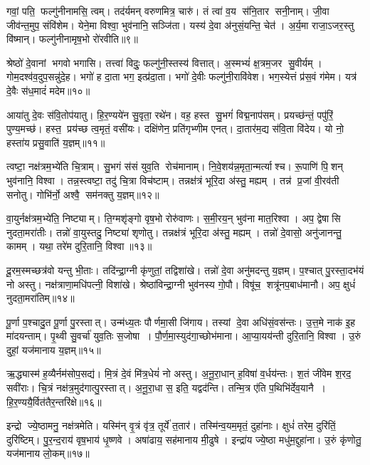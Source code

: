 गवां॒ पति॒ फल्गु॑नीनामसि॒ त्वम्। तद॑र्यमन् वरुणमित्र॒ चारु॑। तं त्वा॑ व॒य स॑नि॒तार सनी॒नाम्। जी॒वा जीव॑न्त॒मुप॒ संवि॑शेम। येने॒मा विश्वा॒ भुव॑नानि॒ सञ्जि॑ता। यस्य॑ दे॒वा अ॑नुसं॒यन्ति॒ चेत॑। अ॒र्य॒मा राजा॒ऽजर॒स्तु वि॑ष्मान्। फल्गु॑नीनामृष॒भो रो॑रवीति॥९॥ 

श्रेष्ठो॑ दे॒वानां भगवो भगासि। तत्त्वा॑ विदुः॒ फल्गु॑नी॒स्तस्य॑ वित्तात्। अ॒स्मभ्यं॑ क्ष॒त्रम॒जर सु॒वीर्यम्। गोम॒दश्व॑व॒दुप॒सन्नु॑दे॒ह। भगो॑ ह दा॒ता भग॒ इत्प्र॑दा॒ता। भगो॑ दे॒वीः फल्गु॑नी॒रावि॑वेश। भग॒स्येत्तं प्र॑स॒वं ग॑मेम। यत्र॑ दे॒वैः स॑ध॒मादं॑ मदेम॥१०॥ 

आया॑तु दे॒वः स॑वि॒तोप॑यातु। हि॒र॒ण्यये॑न सु॒वृता॒ रथे॑न। वह॒\an{} हस्त सु॒भगं॑ विद्म॒नाप॑सम्। प्रयच्छ॑न्तं॒ पपु॑रिं॒ पुण्य॒मच्छ॑। हस्त॒ प्रय॑च्छ त्व॒मृतं॒ वसी॑यः। दक्षि॑णेन॒ प्रति॑गृभ्णीम एनत्। दा॒तार॑म॒द्य स॑वि॒ता वि॑देय। यो नो॒ हस्ता॑य प्रसु॒वाति॑ य॒ज्ञम्॥११॥ 

त्वष्टा॒ नक्ष॑त्रम॒भ्ये॑ति चि॒त्राम्। सु॒भगं स॑सं युव॒ति रोच॑मानाम्। नि॒वे॒शय॑न्न॒\-मृता॒न्मर्त्याश्च। रू॒पाणि॑ पि॒शन् भुव॑नानि॒ विश्वा। तन्न॒स्त्वष्टा॒ तदु॑ चि॒त्रा विच॑ष्टाम्। तन्नक्ष॑त्रं भूरि॒दा अ॑स्तु॒ मह्यम्। तन्न॑ प्र॒जां वी॒रव॑ती सनोतु। गोभि॑र्नो॒ अश्वै॒ सम॑नक्तु य॒ज्ञम्॥१२॥ 

वा॒युर्नक्ष॑त्रम॒भ्ये॑ति॒ निष्ट्याम्। ति॒ग्मशृ॑ङ्गो वृष॒भो रोरु॑वाणः। स॒मी॒रय॒न् भुव॑ना मात॒रिश्वा। अप॒ द्वेषासि नुदता॒मरा॑तीः। तन्नो॑ वा॒युस्तदु॒ निष्ट्या॑ शृणोतु। तन्नक्ष॑त्रं भूरि॒दा अ॑स्तु॒ मह्यम्। तन्नो॑ दे॒वासो॒ अनु॑जानन्तु॒ कामम्। यथा॒ तरे॑म दुरि॒तानि॒ विश्वा॥१३॥ 

दू॒रम॒स्मच्छत्र॑वो यन्तु भी॒ताः। तदि॑न्द्रा॒ग्नी कृ॑णुतां॒ तद्विशा॑खे। तन्नो॑ दे॒वा अनु॑मदन्तु य॒ज्ञम्। प॒श्चात् पु॒रस्ता॒दभ॑यं नो अस्तु। नक्ष॑त्राणा॒मधि॑पत्नी॒ विशा॑खे। श्रेष्ठा॑विन्द्रा॒ग्नी भुव॑नस्य गो॒पौ। विषू॑च॒ शत्रू॑नप॒बाध॑मानौ। अप॒ क्षुधं॑ नुदता॒मरा॑तिम्॥१४॥ 

पू॒र्णा प॒श्चादु॒त पू॒र्णा पु॒रस्तात्। उन्म॑ध्य॒तः पौर्णमा॒सी जि॑गाय। तस्यां दे॒वा अधि॑सं॒वस॑न्तः। उ॒त्त॒मे नाक॑ इ॒ह मा॑दयन्ताम्। पृ॒थ्वी सु॒वर्चा॑ युव॒तिः स॒जोषा। पौ॒र्ण॒मा॒स्युद॑गा॒च्छोभ॑माना। आ॒प्या॒यय॑न्ती दुरि॒तानि॒ विश्वा। उ॒रुं दुहां॒ यज॑मानाय य॒ज्ञम्॥१५॥ 

ऋ॒द्ध्यास्म॑ ह॒व्यैर्नम॑सोप॒सद्य॑। मि॒त्रं दे॒वं मि॑त्र॒धेयं॑ नो अस्तु। अ॒नू॒रा॒धान् ह॒विषा॑ व॒र्धय॑न्तः। श॒तं जी॑वेम श॒रद॒ सवी॑राः। चि॒त्रं नक्ष॑त्र॒मुद॑गात्पु॒रस्तात्। अ॒नू॒रा॒धा स॒ इति॒ यद्वद॑न्ति। तन्मि॒त्र ए॑ति प॒थिभि॑र्देव॒यानै। हि॒र॒ण्ययै॒र्वित॑तै\-र॒न्तरि॑क्षे॥१६॥ 

इन्द्रो ज्ये॒ष्ठामनु॒ नक्ष॑त्रमेति। यस्मि॑न् वृ॒त्रं वृ॑त्र॒ तूर्ये॑ त॒तार॑। तस्मि॑न्व॒यम॒मृतं॒ दुहा॑नाः। क्षुधं॑ तरेम॒ दुरि॑तिं॒ दुरि॑ष्टिम्। पु॒र॒न्द॒राय॑ वृष॒भाय॑ धृ॒ष्णवे। अषा॑ढाय॒ सह॑मानाय मी॒ढुषे। इन्द्रा॑य ज्ये॒ष्ठा मधु॑म॒द्दुहा॑ना। उ॒रुं कृ॑णोतु॒ यज॑मानाय लो॒कम्॥१७॥ 

